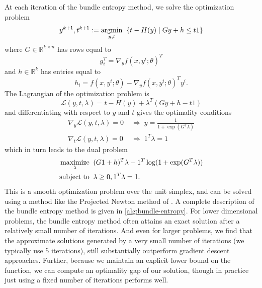 At each iteration of the bundle entropy method, we solve the optimization
problem
\begin{equation}
y^{k+1}, t^{k+1} :=  \operatorname*{argmin}_{y, t} \;\; \{t - H(y) \mid G y + h \leq t1 \}
\end{equation}
where $G \in \mathbb{R}^{k \times n}$ has rows equal to
\begin{equation}
g_i^T = \nabla_y f (x, y^i;\theta)^T
\end{equation}
and $h \in \mathbb{R}^k$ has entries equal to
\begin{equation}
h_i = f(x, y^i;\theta) - \nabla_y f (x, y^i;\theta)^T y^i.
\end{equation}
The Lagrangian of the optimization problem is
\begin{equation}
\mathcal{L}(y,t,\lambda) = t - H(y) + \lambda^T(G y + h - t1)
\end{equation}
and differentiating with respect to $y$ and $t$ gives the optimality conditions
\begin{equation}
\begin{split}
\nabla_y \mathcal{L}(y,t,\lambda) = 0 & \; \Longrightarrow \; y = \frac{1}{1 +
\exp(G^T \lambda)} \\
\nabla_t \mathcal{L}(y,t,\lambda) = 0 & \; \Longrightarrow \; 1^T \lambda = 1
\end{split}
\end{equation}
which in turn leads to the dual problem
\begin{equation}
\begin{split}
\operatorname*{maximize}_\lambda \;\; &(G1 + h)^T \lambda - 1^T\log(1 + \exp(G^T\lambda)) \\
\operatorname*{subject\;to} \;\; & \lambda \geq 0, 1^T \lambda = 1.
\end{split}
\end{equation}
This is a smooth optimization problem over the unit simplex, and can be solved using
a method like
the Projected Newton method of \citep[pg. 241, eq. 97]{bertsekas1982projected}.
A complete description of the bundle entropy
method is given in \cref{alg:bundle-entropy}.
For lower dimensional problems, the bundle entropy method often attains an exact
solution after a relatively small number of iterations. And even for larger
problems, we find that the approximate solutions generated by a very
small number of iterations (we typically use 5 iterations), still
substantially outperform gradient descent approaches. Further, because we
maintain an explicit lower bound on the function, we can compute an
optimality gap of our solution, though in practice just using a fixed number of
iterations performs well.


